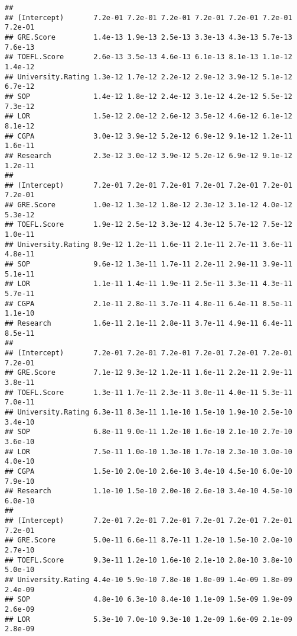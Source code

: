 \documentclass[
]{article}
\begin{document}
\begin{verbatim}
##                                                                          
## (Intercept)       7.2e-01 7.2e-01 7.2e-01 7.2e-01 7.2e-01 7.2e-01 7.2e-01
## GRE.Score         1.4e-13 1.9e-13 2.5e-13 3.3e-13 4.3e-13 5.7e-13 7.6e-13
## TOEFL.Score       2.6e-13 3.5e-13 4.6e-13 6.1e-13 8.1e-13 1.1e-12 1.4e-12
## University.Rating 1.3e-12 1.7e-12 2.2e-12 2.9e-12 3.9e-12 5.1e-12 6.7e-12
## SOP               1.4e-12 1.8e-12 2.4e-12 3.1e-12 4.2e-12 5.5e-12 7.3e-12
## LOR               1.5e-12 2.0e-12 2.6e-12 3.5e-12 4.6e-12 6.1e-12 8.1e-12
## CGPA              3.0e-12 3.9e-12 5.2e-12 6.9e-12 9.1e-12 1.2e-11 1.6e-11
## Research          2.3e-12 3.0e-12 3.9e-12 5.2e-12 6.9e-12 9.1e-12 1.2e-11
##                                                                          
## (Intercept)       7.2e-01 7.2e-01 7.2e-01 7.2e-01 7.2e-01 7.2e-01 7.2e-01
## GRE.Score         1.0e-12 1.3e-12 1.8e-12 2.3e-12 3.1e-12 4.0e-12 5.3e-12
## TOEFL.Score       1.9e-12 2.5e-12 3.3e-12 4.3e-12 5.7e-12 7.5e-12 1.0e-11
## University.Rating 8.9e-12 1.2e-11 1.6e-11 2.1e-11 2.7e-11 3.6e-11 4.8e-11
## SOP               9.6e-12 1.3e-11 1.7e-11 2.2e-11 2.9e-11 3.9e-11 5.1e-11
## LOR               1.1e-11 1.4e-11 1.9e-11 2.5e-11 3.3e-11 4.3e-11 5.7e-11
## CGPA              2.1e-11 2.8e-11 3.7e-11 4.8e-11 6.4e-11 8.5e-11 1.1e-10
## Research          1.6e-11 2.1e-11 2.8e-11 3.7e-11 4.9e-11 6.4e-11 8.5e-11
##                                                                          
## (Intercept)       7.2e-01 7.2e-01 7.2e-01 7.2e-01 7.2e-01 7.2e-01 7.2e-01
## GRE.Score         7.1e-12 9.3e-12 1.2e-11 1.6e-11 2.2e-11 2.9e-11 3.8e-11
## TOEFL.Score       1.3e-11 1.7e-11 2.3e-11 3.0e-11 4.0e-11 5.3e-11 7.0e-11
## University.Rating 6.3e-11 8.3e-11 1.1e-10 1.5e-10 1.9e-10 2.5e-10 3.4e-10
## SOP               6.8e-11 9.0e-11 1.2e-10 1.6e-10 2.1e-10 2.7e-10 3.6e-10
## LOR               7.5e-11 1.0e-10 1.3e-10 1.7e-10 2.3e-10 3.0e-10 4.0e-10
## CGPA              1.5e-10 2.0e-10 2.6e-10 3.4e-10 4.5e-10 6.0e-10 7.9e-10
## Research          1.1e-10 1.5e-10 2.0e-10 2.6e-10 3.4e-10 4.5e-10 6.0e-10
##                                                                          
## (Intercept)       7.2e-01 7.2e-01 7.2e-01 7.2e-01 7.2e-01 7.2e-01 7.2e-01
## GRE.Score         5.0e-11 6.6e-11 8.7e-11 1.2e-10 1.5e-10 2.0e-10 2.7e-10
## TOEFL.Score       9.3e-11 1.2e-10 1.6e-10 2.1e-10 2.8e-10 3.8e-10 5.0e-10
## University.Rating 4.4e-10 5.9e-10 7.8e-10 1.0e-09 1.4e-09 1.8e-09 2.4e-09
## SOP               4.8e-10 6.3e-10 8.4e-10 1.1e-09 1.5e-09 1.9e-09 2.6e-09
## LOR               5.3e-10 7.0e-10 9.3e-10 1.2e-09 1.6e-09 2.1e-09 2.8e-09

\end{verbatim}
\end{document}
